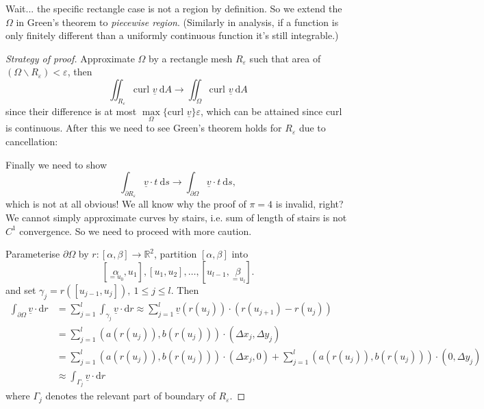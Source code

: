 \documentclass[a4paper]{article}
\theoremstyle{definition}
\newcommand{\curl}{\text{curl }}
\begin{document}
Wait... the specific rectangle case is not a region by definition. So we extend the $\Omega$ in Green's theorem to \textit{piecewise region}. (Similarly in analysis, if a function is only finitely different than a uniformly continuous function it's still integrable.)
\begin{proof}[Strategy of proof]
Approximate $\Omega$ by a rectangle mesh $R_\varepsilon$ such that area of $(\Omega \backslash R_\varepsilon) < \varepsilon$, then
\[
\iint_{R_\varepsilon}\curl \underline v \ \mathrm d A \rightarrow \iint_\Omega \curl \underline v \ \mathrm d A
\]
since their difference is at most $\underset{\Omega}{\max} \{\curl \underline v\} \varepsilon$, which can be attained since $\curl$ is continuous. After this we need to see Green's theorem holds for $R_\varepsilon$ due to cancellation:
\begin{center}
\end{center}
Finally we need to show
\[
\int_{\partial R_\varepsilon} \underline v \cdot t \ \mathrm d s \rightarrow \int_{\partial \Omega} \underline v \cdot t \ \mathrm d s,
\tag{$\ast$}
\]
which is not at all obvious! We all know why the proof of $\pi= 4$ is invalid, right? We cannot simply approximate curves by stairs, i.e. sum of length of stairs is not $C^1$ convergence. So we need to proceed with more caution.

Parameterise $\partial \Omega$ by $r:[\alpha,\beta]\rightarrow \mathbb R^2$, partition $[\alpha,\beta]$ into
\[
[\underset{=u_0}{\alpha},u_1],[u_1,u_2],\ldots,[u_{l-1},\underset{=u_l}{\beta}].
\]
and set $\gamma_j = r\left( \left[ u_{j-1},u_j\right]\right),\ 1\leq j\leq l.$ Then
\[
\begin{aligned}
\int_{\partial \Omega} \underline v \cdot \mathrm d r &= \sum_{j=1}^l \int_{\gamma_j} \underline v \cdot \mathrm d r \approx \sum_{j=1}^l \underline v (r(u_j)) \cdot (r(u_{j+1})-r(u_j)) \\
&=\sum_{j=1}^l \left(a(r(u_j)),b(r(u_j)) \right) \cdot \left( \Delta x_j,\Delta y_j \right) \\
&=\sum_{j=1}^l \left(a(r(u_j)),b(r(u_j)) \right) \cdot \left( \Delta x_j,0 \right)+\sum_{j=1}^l \left(a(r(u_j)),b(r(u_j)) \right) \cdot \left(0,\Delta y_j \right) \\
&\approx \int_{\Gamma_j} \underline v \cdot \mathrm d r
\end{aligned}
\]
where $\Gamma_j$ denotes the relevant part of boundary of $R_\varepsilon$.


\end{proof}
\end{document}
